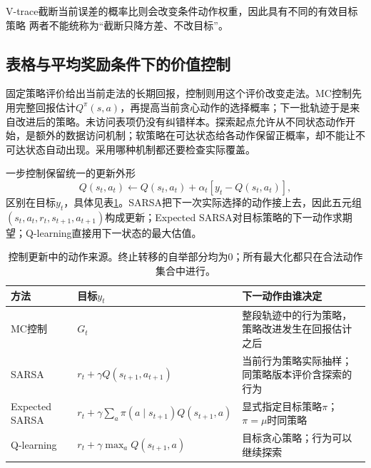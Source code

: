 V-trace截断当前误差的概率比则会改变条件动作权重，因此具有不同的有效目标策略
两者不能统称为“截断只降方差、不改目标”。

\subsection{表格与平均奖励条件下的价值控制}
\label{sec:rl-learning-tabular-control}

固定策略评价给出当前走法的长期回报，控制则用这个评价改变走法。MC控制先用完整回报估计$Q^\pi(s,a)$，再提高当前贪心动作的选择概率；下一批轨迹于是来自改进后的策略。未访问表项仍没有纠错样本。探索起点允许从不同状态动作开始，是额外的数据访问机制；软策略在可达状态给各动作保留正概率，却不能让不可达状态自动出现。采用哪种机制都还要检查实际覆盖。

一步控制保留统一的更新外形
\begin{equation}
  Q(s_t,a_t)\leftarrow Q(s_t,a_t)
        +\alpha_t[y_t-Q(s_t,a_t)],
  \label{eq:rl-learning-control-update}
\end{equation}
区别在目标$y_t$，具体见表\ref{tab:rl-learning-control-targets}。SARSA把下一次实际选择的动作接上去，因此五元组$(s_t,a_t,r_t,s_{t+1},a_{t+1})$构成更新；Expected SARSA对目标策略的下一动作求期望；Q-learning直接用下一状态的最大估值。

\begin{table}[t]
  \centering
  \small
  \begin{tabularx}{\linewidth}{>{\raggedright\arraybackslash}p{28mm} >{\raggedright\arraybackslash}X >{\raggedright\arraybackslash}X}
    \toprule
    方法 & 目标$y_t$ & 下一动作由谁决定 \\
    \midrule
    MC控制 & $G_t$ & 整段轨迹中的行为策略，策略改进发生在回报估计之后 \\
    SARSA & $r_t+\gamma Q(s_{t+1},a_{t+1})$ & 当前行为策略实际抽样；同策略版本评价含探索的行为 \\
    Expected SARSA & $r_t+\gamma\sum_a\pi(a\mid s_{t+1})Q(s_{t+1},a)$ & 显式指定目标策略$\pi$；$\pi=\mu$时同策略 \\
    Q-learning & $r_t+\gamma\max_aQ(s_{t+1},a)$ & 目标贪心策略；行为可以继续探索 \\
    \bottomrule
  \end{tabularx}
  \caption{控制更新中的动作来源。终止转移的自举部分均为0；所有最大化都只在合法动作集合中进行。}
  \label{tab:rl-learning-control-targets}
\end{table}

